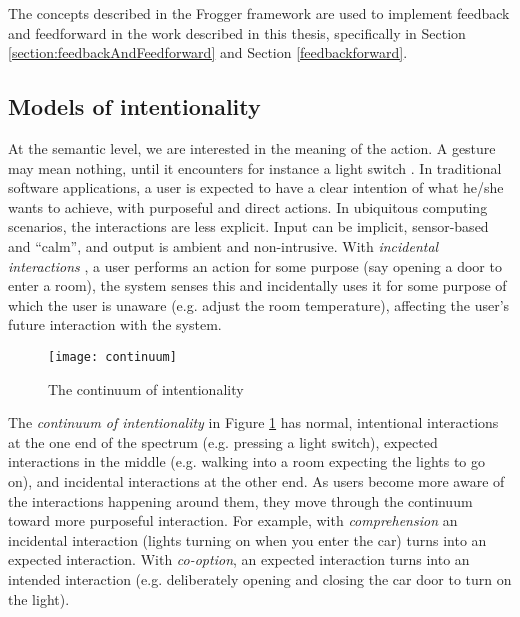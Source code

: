 
The concepts described in the Frogger framework are used to implement feedback and feedforward in the work described in this thesis, specifically in Section \ref{section:feedbackAndFeedforward} and Section \ref{feedbackforward}. 
	
\subsection{Models of intentionality}
\label{intentionalSpectrum}
	
	At the semantic level, we are interested in the meaning of the action. A gesture may mean nothing, until it encounters for instance a light switch \cite{Bongers2007}. In traditional software applications, a user is expected to have a clear intention of what he/she wants to achieve, with purposeful and direct actions. In ubiquitous computing scenarios, the interactions are less explicit. Input can be implicit, sensor-based and ``calm'', and output is ambient and non-intrusive. With \emph{incidental interactions} \cite{Dix2004}, a user performs an action for some purpose (say opening a door to enter a room), the system senses this and incidentally uses it for some purpose of which the user is unaware (e.g. adjust the room temperature), affecting the user's future interaction with the system.
	
\begin{figure}
	\centering
	\centerline{\texttt{[image: continuum]}}
	\caption{The continuum of intentionality}
	\label{continuum}
\end{figure}	

	The \emph{continuum of intentionality} in Figure \ref{continuum} has normal, intentional interactions at the one end of the spectrum (e.g. pressing a light switch), expected interactions in the middle (e.g. walking into a room expecting the lights to go on), and incidental interactions at the other end. As users become more aware of the interactions happening around them, they move through the continuum toward more purposeful interaction. For example, with \emph{comprehension} an incidental interaction (lights turning on when you enter the car) turns into an expected interaction. With \emph{co-option}, an expected interaction turns into an intended interaction (e.g. deliberately opening and closing the car door to turn on the light).

